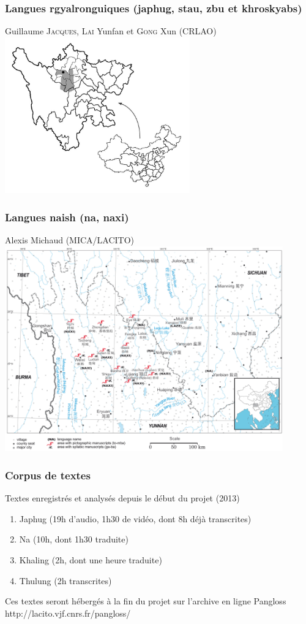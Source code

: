 \documentclass[xcolor=table]{beamer}
\newcommand{\bleu}[1]{{\color{blue}#1}}
\begin{document}
  \begin{frame} 
 \frametitle{Langues rgyalronguiques (japhug, stau, zbu et khroskyabs)}
  Guillaume \textsc{Jacques}, \textsc{Lai} Yunfan et \textsc{Gong} Xun (CRLAO)
 \includegraphics[width=0.6\textwidth]{carte.JPG} \centering
 
  \end{frame}  
 
  \begin{frame} 
 \frametitle{Langues naish (na, naxi)}
 
 Alexis Michaud (MICA/LACITO)
  \includegraphics[width=0.9\textwidth]{naish.jpg} \centering
 
  \end{frame}   
 
 \begin{frame} 
 \frametitle{Corpus de textes}

Textes enregistrés et analysés depuis le début du projet (2013)

\begin{enumerate}[<+->]
\item Japhug (19h d'audio, 1h30 de vidéo, dont 8h déjà transcrites)
\item  Na (10h, dont 1h30 traduite)
\item  Khaling (2h, dont une heure traduite)
\item  Thulung (2h transcrites)
\end{enumerate}

 Ces textes seront hébergés à la fin du projet sur l'archive en ligne Pangloss \bleu{http://lacito.vjf.cnrs.fr/pangloss/}
 \end{frame} 
 
\end{document}
